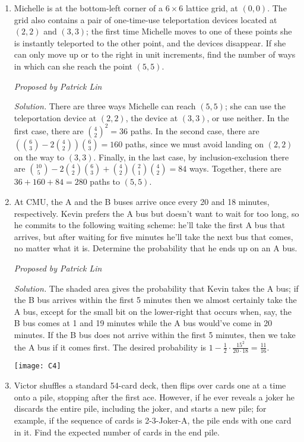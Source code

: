 \documentclass[10pt]{article}
\newcommand{\proposed}[1]
{
\vspace{5pt}
\noindent\textit{Proposed by #1}
}
\newcommand{\solution}
{
\vspace{5pt}
\noindent\textit{Solution.}\qquad
}
\begin{document}
\begin{enumerate}
\item Michelle is at the bottom-left corner of a $6\times 6$ lattice grid, at $(0,0)$. The grid also contains a pair of one-time-use teleportation devices located at $(2,2)$ and $(3,3)$; the first time Michelle moves to one of these points she is instantly teleported to the other point, and the devices disappear. If she can only move up or to the right in unit increments, find the number of ways in which can she reach the point $(5,5)$.

\proposed{Patrick Lin}

\solution There are three ways Michelle can reach $(5,5)$; she can use the teleportation device at $(2,2)$, the device at $(3,3)$, or use neither. In the first case, there are $\binom{4}{2}^2 = 36$ paths. In the second case, there are $(\binom{6}{3} - 2\binom{4}{2})\binom{6}{3} = 160$ paths, since we must avoid landing on $(2,2)$ on the way to $(3,3)$. Finally, in the last case, by inclusion-exclusion there are $\binom{10}{5} - 2\binom{4}{2}\binom{6}{3}+\binom{4}{2}\binom{2}{1}\binom{4}{2} = 84$ ways. Together, there are $36+160+84=\boxed{280}$ paths to $(5,5)$.


\item At CMU, the A and the B buses arrive once every 20 and 18 minutes, respectively. Kevin prefers the A bus but doesn't want to wait for too long, so he commits to the following waiting scheme: he'll take the first A bus that arrives, but after waiting for five minutes he'll take the next bus that comes, no matter what it is. Determine the probability that he ends up on an A bus.

\proposed{Patrick Lin}

\solution The shaded area gives the probability that Kevin takes the A bus; if the B bus arrives within the first 5 minutes then we almost certainly take the A bus, except for the small bit on the lower-right that occurs when, say, the B bus comes at 1 and 19 minutes while the A bus would've come in 20 minutes. If the B bus does not arrive within the first 5 minutes, then we take the A bus if it comes first. The desired probability is $1-\frac12\cdot\frac{15^2}{20\cdot18} = \boxed{\tfrac{11}{16}}$.

\begin{center}
\texttt{[image: C4]}
\end{center}



\item Victor shuffles a standard 54-card deck, then flips over cards one at a time onto a pile, stopping after the first ace. However, if he ever reveals a joker he discards the entire pile, including the joker, and starts a new pile; for example, if the sequence of cards is 2-3-Joker-A, the pile ends with one card in it. Find the expected number of cards in the end pile.


\end{enumerate}
\end{document}

